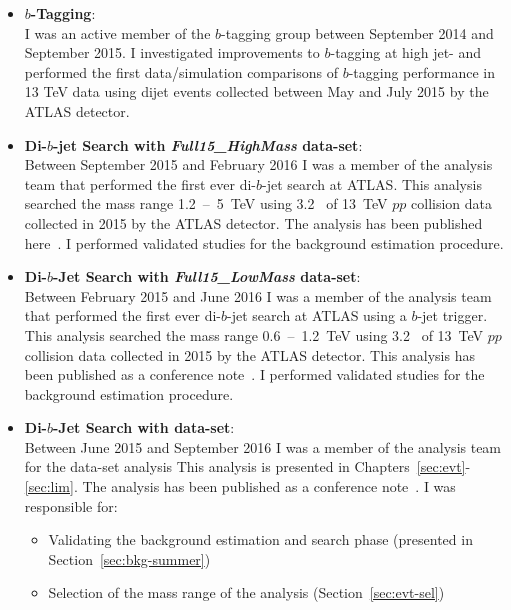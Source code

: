 \begin{itemize}[leftmargin=*]
\item\textbf{$b$-Tagging}:\\
  I was an active member of the $b$-tagging group between September 2014 and September 2015.
  I investigated improvements to $b$-tagging at high jet-\pT{} and
  performed the first data/simulation comparisons of $b$-tagging performance in 13 TeV data using dijet events collected between May and July 2015 by the ATLAS detector. \vspace{1em}
\item\textbf{Di-$b$-jet Search with \textit{Full15\_HighMass} data-set}:\\
  Between September 2015 and February 2016 I was a member of the analysis team that performed the first ever di-$b$-jet search at ATLAS.
  This analysis searched the mass range 1.2~--~5~TeV using 3.2~\ifb{} of 13~TeV $pp$ collision data collected in 2015 by the ATLAS detector.
  The analysis has been published here~\cite{dibjet-mori16_paper}. 
  I performed validated studies for the background estimation procedure. \vspace{1em}
\item\textbf{Di-$b$-Jet Search  with \textit{Full15\_LowMass} data-set}:\\
  Between February 2015 and June 2016 I was a member of the analysis team that performed the first ever di-$b$-jet search at ATLAS using a $b$-jet trigger.
  This analysis searched the mass range 0.6~--~1.2~TeV using 3.2~\ifb{} of 13~TeV $pp$ collision data collected in 2015 by the ATLAS detector.
  This analysis has been published as a conference note~\cite{dibjet-lhcp_conf}.
  I performed validated studies for the background estimation procedure. \vspace{1em}
    \newpage
\item\textbf{Di-$b$-Jet Search  with \summer{} data-set}:\\ 
  Between June 2015 and September 2016 I was a member of the analysis team for the \summer{} data-set analysis
  This analysis is presented in Chapters~\ref{sec:evt}-\ref{sec:lim}.
  The analysis has been published as a conference note~\cite{dibjet-ichep_conf}. 
  I was responsible for:
  \begin{itemize}
    \item Validating the background estimation and search phase (presented in Section~\ref{sec:bkg-summer})
    \item Selection of the mass range of the analysis (Section~\ref{sec:evt-sel})

\end{itemize}
\end{itemize}
